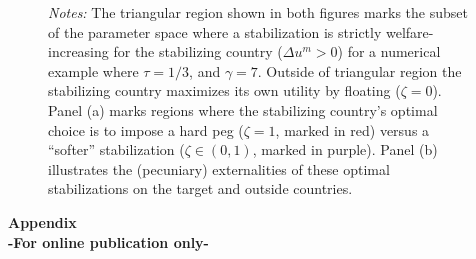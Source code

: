 \documentclass[12pt,letter]{article}
\theoremstyle{break} \theorembodyfont{\normalfont\itshape}
\theoremstyle{break}
\theoremstyle{break} \theorembodyfont{\normalfont\itshape}
\theoremstyle{break} \theorembodyfont{\normalfont\itshape}
\begin{document}
\begin{figure}
\begin{minipage}{\linewidth}
\begin{centering}
\begin{subfigure}{.49\textwidth}
      \end{subfigure}

    \end{centering}

    \bigskip \small \textit{Notes:} The triangular region shown in
    both figures marks the subset of the parameter space where a
    stabilization is strictly welfare-increasing for the stabilizing
    country ($\Delta u^m>0 $) for a numerical example where
    \(\tau=1/3\), and \(\gamma=7\). Outside of triangular region the
    stabilizing country maximizes its own utility by floating
    ($\zeta=0 $). Panel (a) marks regions where the stabilizing
    country's optimal choice is to impose a hard peg ($\zeta=1 $,
    marked in red) versus a ``softer'' stabilization
    ($\zeta\in (0,1) $, marked in purple). Panel (b) illustrates the
    (pecuniary) externalities of these optimal stabilizations on the
    target and outside countries. \end{minipage}
\end{figure}

\clearpage



\bigskip \pagebreak \appendix

\FloatBarrier

\begin{center}
  {\Huge\bf Appendix}\\
  {\large\bf -For online publication only-}
\end{center}



\clearpage


\end{document}

